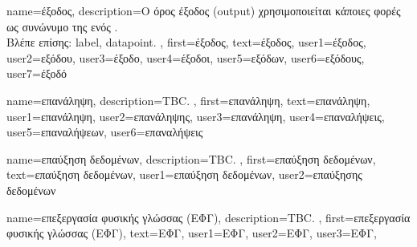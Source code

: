 {name={\foreignlanguage{greek}{έξοδος}},
	description={\foreignlanguage{greek}{Ο όρος έξοδος} (output) \foreignlanguage{greek}{χρησιμοποιείται 
		κάποιες φορές ως συνώνυμο της}  \foreignlanguage{greek}{ενός}  \cite{Murphy2012}.
		\\
		\foreignlanguage{greek}{Βλέπε επίσης:} \gls{label}, \gls{datapoint}. },  
 	first={\foreignlanguage{greek}{έξοδος}}, 
 	text={\foreignlanguage{greek}{έξοδος}},
	user1={\foreignlanguage{greek}{έξοδος}}, %
  	user2={\foreignlanguage{greek}{εξόδου}}, %
	user3={\foreignlanguage{greek}{έξοδο}}, %
	user4={\foreignlanguage{greek}{έξοδοι}}, %
  	user5={\foreignlanguage{greek}{εξόδων}}, %
	user6={\foreignlanguage{greek}{εξόδους}}, %
	user7={\foreignlanguage{greek}{έξοδό}} %
}

{name={\foreignlanguage{greek}{επανάληψη}},
	description={TBC.  },
	first={\foreignlanguage{greek}{επανάληψη}},
	text={\foreignlanguage{greek}{επανάληψη}},
	user1={\foreignlanguage{greek}{επανάληψη}}, %
  	user2={\foreignlanguage{greek}{επανάληψης}}, %
	user3={\foreignlanguage{greek}{επανάληψη}}, %
	user4={\foreignlanguage{greek}{επαναλήψεις}}, %
  	user5={\foreignlanguage{greek}{επαναλήψεων}}, %
	user6={\foreignlanguage{greek}{επαναλήψεις}} %
}

{name={\foreignlanguage{greek}{επαύξηση δεδομένων}},
	description={TBC. },
	first={\foreignlanguage{greek}{επαύξηση δεδομένων}},
	text={\foreignlanguage{greek}{επαύξηση δεδομένων}},
	user1={\foreignlanguage{greek}{επαύξηση δεδομένων}}, %
  	user2={\foreignlanguage{greek}{επαύξησης δεδομένων}} %
}

{name={\foreignlanguage{greek}{επεξεργασία φυσικής γλώσσας (ΕΦΓ)}},
	description={TBC. }, 
	first={\foreignlanguage{greek}{επεξεργασία φυσικής γλώσσας (ΕΦΓ)}}, 
	text={\foreignlanguage{greek}{ΕΦΓ}},
	user1={\foreignlanguage{greek}{ΕΦΓ}}, %
  	user2={\foreignlanguage{greek}{ΕΦΓ}}, %
	user3={\foreignlanguage{greek}{ΕΦΓ}}, %
}

